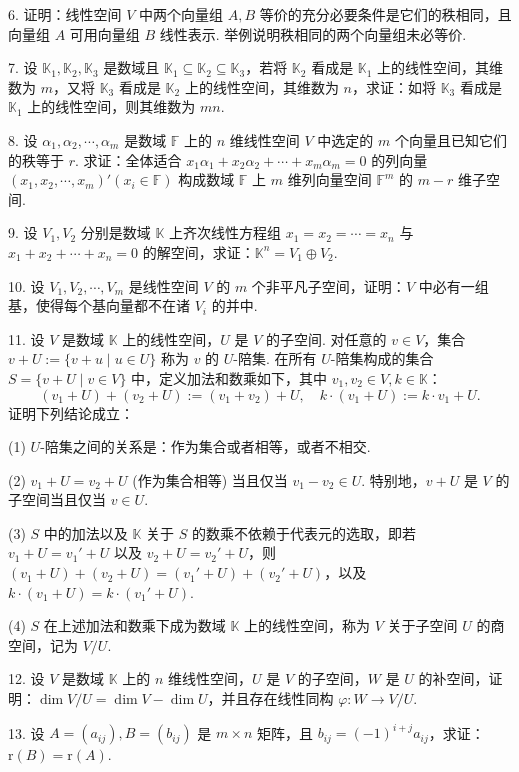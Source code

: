 \documentclass[UTF8, 12pt, fontset=fandol, oneside]{ctexart}
\begin{document}
6. 证明：线性空间 $V$ 中两个向量组 $A,B$ 等价的充分必要条件是它们的秩相同，且向量组 $A$ 可用向量组 $B$ 线性表示. 举例说明秩相同的两个向量组未必等价.

7. 设 $\mathbb{K}_1,\mathbb{K}_2,\mathbb{K}_3$ 是数域且 $\mathbb{K}_1\subseteq\mathbb{K}_2\subseteq\mathbb{K}_3$，若将 $\mathbb{K}_2$ 看成是 $\mathbb{K}_1$ 上的线性空间，其维数为 $m$，又将 $\mathbb{K}_3$ 看成是 $\mathbb{K}_2$ 上的线性空间，其维数为 $n$，求证：如将 $\mathbb{K}_3$ 看成是 $\mathbb{K}_1$ 上的线性空间，则其维数为 $mn$.

8. 设 $\alpha_1,\alpha_2,\cdots,\alpha_m$ 是数域 $\mathbb{F}$ 上的 $n$ 维线性空间 $V$ 中选定的 $m$ 个向量且已知它们的秩等于 $r$. 求证：全体适合 $x_1\alpha_1+x_2\alpha_2+\cdots+x_m\alpha_m=0$ 的列向量 $(x_1,x_2,\cdots,x_m)'(x_i\in\mathbb{F})$ 构成数域 $\mathbb{F}$ 上 $m$ 维列向量空间 $\mathbb{F}^m$ 的 $m-r$ 维子空间.

9. 设 $V_1,V_2$ 分别是数域 $\mathbb{K}$ 上齐次线性方程组 $x_1=x_2=\cdots=x_n$ 与 $x_1+x_2+\cdots+x_n=0$ 的解空间，求证：$\mathbb{K}^n=V_1\oplus V_2$.

10. 设 $V_1,V_2,\cdots,V_m$ 是线性空间 $V$ 的 $m$ 个非平凡子空间，证明：$V$ 中必有一组基，使得每个基向量都不在诸 $V_i$ 的并中.

11. 设 $V$ 是数域 $\mathbb{K}$ 上的线性空间，$U$ 是 $V$ 的子空间. 对任意的 $v\in V$，集合 $v+U:=\{v+u\mid u\in U\}$ 称为 $v$ 的 $U$-陪集. 在所有 $U$-陪集构成的集合 $S=\{v+U\mid v\in V\}$ 中，定义加法和数乘如下，其中 $v_1,v_2\in V,k\in\mathbb{K}$：
\[
(v_1+U)+(v_2+U):=(v_1+v_2)+U,\quad k\cdot(v_1+U):=k\cdot v_1+U.
\]
证明下列结论成立：

(1) $U$-陪集之间的关系是：作为集合或者相等，或者不相交.

(2) $v_1+U=v_2+U$ (作为集合相等) 当且仅当 $v_1-v_2\in U$. 特别地，$v+U$ 是 $V$ 的子空间当且仅当 $v\in U$.

(3) $S$ 中的加法以及 $\mathbb{K}$ 关于 $S$ 的数乘不依赖于代表元的选取，即若 $v_1+U=v_1'+U$ 以及 $v_2+U=v_2'+U$，则 $(v_1+U)+(v_2+U)=(v_1'+U)+(v_2'+U)$，以及 $k\cdot(v_1+U)=k\cdot(v_1'+U)$.

(4) $S$ 在上述加法和数乘下成为数域 $\mathbb{K}$ 上的线性空间，称为 $V$ 关于子空间 $U$ 的商空间，记为 $V/U$.

12. 设 $V$ 是数域 $\mathbb{K}$ 上的 $n$ 维线性空间，$U$ 是 $V$ 的子空间，$W$ 是 $U$ 的补空间，证明：$\dim V/U=\dim V-\dim U$，并且存在线性同构 $\varphi:W\to V/U$.

13. 设 $A=(a_{ij}),B=(b_{ij})$ 是 $m\times n$ 矩阵，且 $b_{ij}=(-1)^{i+j}a_{ij}$，求证：$\mathrm{r}(B)=\mathrm{r}(A)$.
\end{document}
